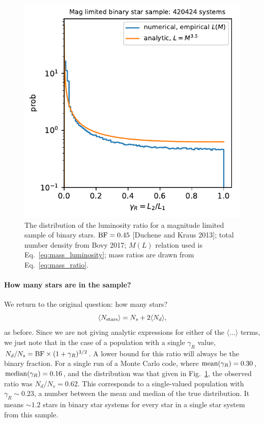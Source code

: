 \documentclass{emulateapj}
\begin{document}
\begin{figure}[!t]
	\begin{center}
		\includegraphics[scale=.8]{figures/gammaR_distribn_mag_limited.pdf}
	\end{center}
	\caption{The distribution of the luminosity ratio for a magnitude limited 
		sample of binary stars. ${\rm BF} = 0.45$ [Duchene and Kraus 2013]; 
		total 
		number density from Bovy 2017; $M(L)$ relation used is 
		Eq.~\ref{eq:mass_luminosity}; mass ratios are drawn from 
		Eq.~\ref{eq:mass_ratio}.}
	\label{fig:gammaR_distribn_mag_limited}
\end{figure}

\paragraph{How many stars are in the sample?}

We return to the original question: how many stars?
\begin{equation}
\langle N_{\rm stars} \rangle = N_s + 2 \langle N_d \rangle,
\end{equation}
as before.
Since we are not giving analytic expressions for either of the $\langle \ldots 
\rangle$ terms, we just note that in the case of a population with a single 
$\gamma_R$ value, $N_d/N_s = {\rm BF} \times (1 + \gamma_R)^{3/2}$. A lower
bound for this ratio will always be the binary fraction.
For a single run of a Monte Carlo code, where ${\rm mean}(\gamma_R) = 0.30$, 
${\rm median}(\gamma_R) = 0.16$, and the distribution was that given in 
Fig.~\ref{fig:gammaR_distribn_mag_limited}, the observed ratio was $N_d/N_s = 
0.62$.
This corresponds to a single-valued population with $\gamma_R \sim 0.23$, a
number between the mean and median of the true distribution.
It means $\sim 1.2$ stars in binary star systems for every star in a single 
star system from this sample.
\end{document}
